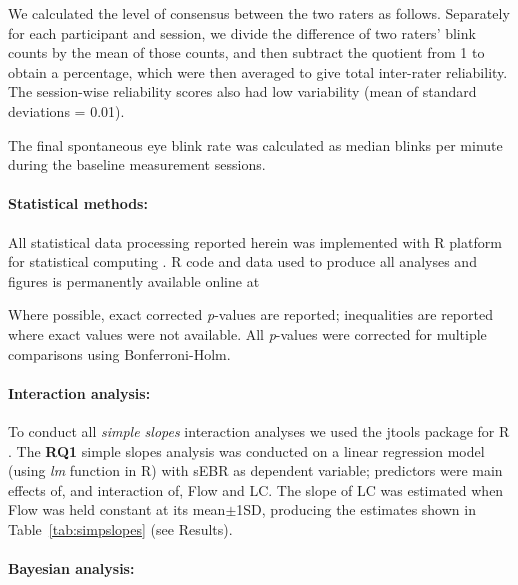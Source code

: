 \documentclass[10pt,letterpaper,floatsintext]{article}
\begin{document}
We calculated the level of consensus between the two raters as follows. Separately for each participant and session, we divide the difference of two raters' blink counts by the mean of those counts, and then subtract the quotient from 1 to obtain a percentage, which were then averaged to give total inter-rater reliability. The session-wise reliability scores also had low variability (mean of standard deviations = 0.01).

The final spontaneous eye blink rate was calculated as median blinks per minute during the baseline measurement sessions.

\paragraph{Statistical methods:}
All statistical data processing reported herein was implemented with {\sf R} platform for statistical computing \cite{R2014}. {\sf R} code and data used to produce all analyses and figures is permanently available online at %

Where possible, exact corrected {\it p}-values are reported; inequalities are reported where exact values were not available.
All {\it p}-values were corrected for multiple comparisons using Bonferroni-Holm.


\paragraph{Interaction analysis:}
To conduct all {\it simple slopes} interaction analyses we used the {\sf jtools} package for {\sf R} \cite{jtools}. The {\bf RQ1} simple slopes analysis was conducted on a linear regression model (using {\it lm} function in {\sf R}) with sEBR as dependent variable; predictors were main effects of, and interaction of, Flow and LC. The slope of LC was estimated when Flow was held constant at its mean$\pm$1SD, producing the estimates shown in Table~\ref{tab:simpslopes} (see Results).

\paragraph{Bayesian analysis:}
\end{document}
